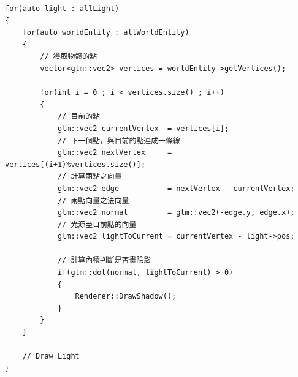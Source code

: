 \begin{lstlisting}
for(auto light : allLight)
{
    for(auto worldEntity : allWorldEntity)
    {
        // 獲取物體的點
        vector<glm::vec2> vertices = worldEntity->getVertices();
        
        for(int i = 0 ; i < vertices.size() ; i++)
        {
            // 目前的點
            glm::vec2 currentVertex  = vertices[i];
            // 下一個點，與目前的點連成一條線
            glm::vec2 nextVertex     = vertices[(i+1)%vertices.size()];
            // 計算兩點之向量
            glm::vec2 edge           = nextVertex - currentVertex;
            // 兩點向量之法向量
            glm::vec2 normal         = glm::vec2(-edge.y, edge.x);
            // 光源至目前點的向量
            glm::vec2 lightToCurrent = currentVertex - light->pos;
            
            // 計算內積判斷是否畫陰影
            if(glm::dot(normal, lightToCurrent) > 0)
            {
                Renderer::DrawShadow();
            }
        }
    }
    
    // Draw Light
}
\end{lstlisting}





